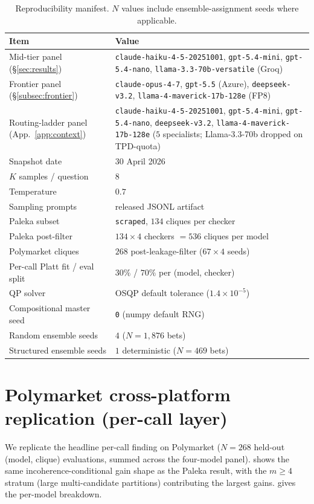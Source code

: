 \documentclass{article}
\theoremstyle{plain}
\theoremstyle{definition}
\theoremstyle{remark}
\begin{document}
\begin{table}[H]
\centering
\caption{Reproducibility manifest. $N$ values include
ensemble-assignment seeds where applicable.}
\label{tab:repro}
\small
\begin{tabular}{ll}
\toprule
\textbf{Item} & \textbf{Value} \\
\midrule
Mid-tier panel (\S\ref{sec:results}) & \texttt{claude-haiku-4-5-20251001}, \texttt{gpt-5.4-mini}, \texttt{gpt-5.4-nano}, \texttt{llama-3.3-70b-versatile} (Groq) \\
Frontier panel (\S\ref{subsec:frontier}) & \texttt{claude-opus-4-7}, \texttt{gpt-5.5} (Azure), \texttt{deepseek-v3.2}, \texttt{llama-4-maverick-17b-128e} (FP8) \\
Routing-ladder panel (App.~\ref{app:context}) & \texttt{claude-haiku-4-5-20251001}, \texttt{gpt-5.4-mini}, \texttt{gpt-5.4-nano}, \texttt{deepseek-v3.2}, \texttt{llama-4-maverick-17b-128e} ($5$ specialists; Llama-3.3-70b dropped on TPD-quota) \\
Snapshot date      & 30 April 2026 \\
$K$ samples / question & $8$ \\
Temperature        & $0.7$ \\
Sampling prompts   & released JSONL artifact \\
Paleka subset      & \texttt{scraped}, $134$ cliques per checker \\
Paleka post-filter & $134\!\times\!4$ checkers $=536$ cliques per model \\
Polymarket cliques & $268$ post-leakage-filter ($67\!\times\!4$ seeds) \\
Per-call Platt fit / eval split & $30\%$ / $70\%$ per (model, checker) \\
QP solver          & \textsc{OSQP} default tolerance ($1.4\!\times\!10^{-5}$) \\
Compositional master seed & \texttt{0} (numpy default RNG) \\
Random ensemble seeds & $4$ ($N{=}1{,}876$ bets) \\
Structured ensemble seeds & $1$ deterministic ($N{=}469$ bets) \\
\bottomrule
\end{tabular}
\end{table}
\vspace*{-0.3em}

\section{Polymarket cross-platform replication (per-call layer)}
\label{app:polymarket}
We replicate the headline per-call finding on Polymarket
($N{=}268$ held-out (model, clique) evaluations, summed across the
four-model panel).  shows the same
incoherence-conditional gain shape as the Paleka result, with the
$m{\ge}4$ stratum (large multi-candidate partitions) contributing
the largest gains.  gives the per-model
breakdown.
\end{document}
